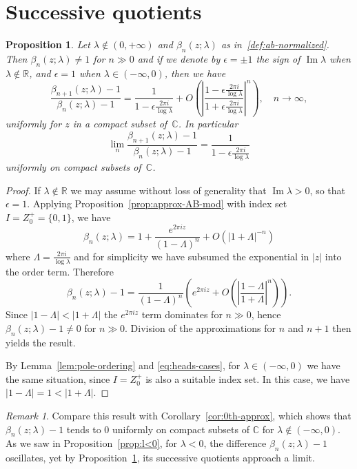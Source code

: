 \documentclass[11pt,a4paper]{amsart}
\newcommand{\R}{\mathbb{R}}
\newcommand{\C}{\mathbb{C}}
\renewcommand{\Im}{\operatorname{Im}}
\theoremstyle{plain}
\newtheorem{prop}[theorem]{Proposition}
\theoremstyle{remark}
\newtheorem{remark}{Remark}
\begin{document}
\section{Successive quotients}



\begin{prop}
\label{prop:quot-AB}
Let $\lambda \notin (0,+\infty)$ and $\beta_{n}(z;\lambda)$ as in~\eqref{def:ab-normalized}. 
Then $\beta_{n}(z;\lambda) \neq 1$ for $n \gg 0$ and 
if we denote by $\epsilon = \pm 1$ the sign of $\Im \lambda$ when $\lambda \notin \R$, and
$\epsilon = 1$ when $\lambda \in (-\infty,0)$, then we have
$$
	  \frac{\beta_{n+1}(z;\lambda) - 1}{\beta_{n}(z;\lambda) - 1}
	= \frac{1}{1 - \epsilon\frac{2\pi i}{\log\lambda}} 
	  + O\left(
	     \left|
	             \frac{1 - \epsilon\tfrac{2\pi i}{\log\lambda}}
	                  {1 + \epsilon\tfrac{2\pi i}{\log\lambda}}
	     \right|^{n}
	     \right),
	     \quad
	     n \to \infty, 
$$
uniformly for $z$ in a compact subset of~$\C$. In particular
$$
	  \lim_{n} \frac{\beta_{n+1}(z;\lambda) - 1}{\beta_{n}(z;\lambda) - 1}
	= \frac{1}{1 - \epsilon\frac{2\pi i}{\log\lambda}}
$$
uniformly on compact subsets of~$\C$.
\end{prop}

\begin{proof}
If $\lambda \notin \R$ we may assume without loss of generality that $\Im \lambda > 0$, so that $\epsilon = 1$. 
Applying Proposition~\ref{prop:approx-AB-mod} with index set $I = Z_{0}^{+} = \{0,1\}$, we have
$$
	\beta_{n}(z;\lambda) = 1 + \frac{e^{2\pi i z}}{(1-\Lambda)^{n}} + O(|1+\Lambda|^{-n})
$$
where $\Lambda = \frac{2\pi i}{\log\lambda}$ and for simplicity we have subsumed the exponential in $|z|$ into the 
order term. Therefore
$$
	  \beta_{n}(z;\lambda) - 1 
	= \frac{1}{(1-\Lambda)^{n}} \left(e^{2\pi i z} + O\left(\left|\frac{1-\Lambda}{1+\Lambda}\right|^{n}\right)\right).
$$
Since $|1-\Lambda| < |1+\Lambda|$ the $e^{2\pi i z}$ term dominates for $n \gg 0$, hence
$\beta_{n}(z;\lambda) - 1 \neq 0$ for $n \gg 0$. Division of the approximations for $n$ and 
$n+1$ then yields the result.

By Lemma~\ref{lem:pole-ordering} and \eqref{eq:heads-cases}, for $\lambda \in (-\infty,0)$ we have the same situation, since $I = Z_{0}^{+}$ is also a suitable index set. In this case, we have $|1-\Lambda| = 1 < |1 + \Lambda|$.
\end{proof}

\begin{remark}
Compare this result with Corollary~\ref{cor:0th-approx}, which shows that $\beta_{n}(z;\lambda) - 1$ tends to $0$
uniformly on compact subsets of $\C$ for $\lambda \notin (-\infty,0)$. As we saw in Proposition~\ref{prop:l<0},
for $\lambda < 0$, the difference $\beta_{n}(z;\lambda) - 1$ oscillates, yet by
Proposition~\ref{prop:quot-AB}, its successive quotients approach a limit.
\end{remark}
\end{document}
